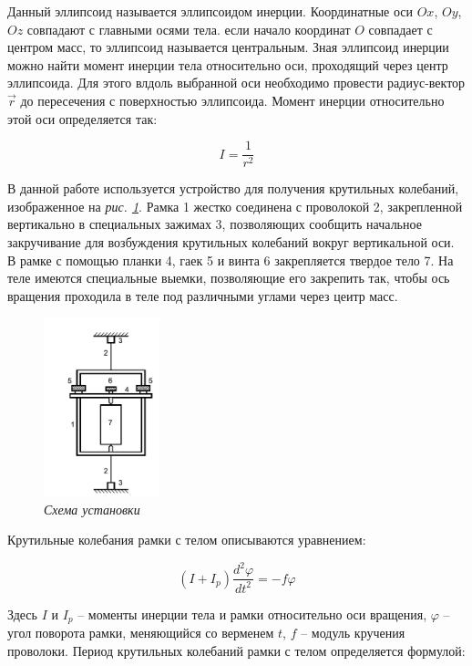 \documentclass[a4paper,12pt]{article}
\begin{document}
Данный эллипсоид называется эллипсоидом инерции. Координатные оси $Ox$, $Oy$, $Oz$ совпадают с главными осями тела. если начало координат $O$ совпадает с центром масс, то эллипсоид называется центральным. Зная эллипсоид инерции можно найти момент инерции тела относительно оси, проходящий через центр эллипсоида. Для этого влдоль выбранной оси необходимо провести радиус-вектор $\vec{r}$ до пересечения с поверхностью эллипсоида. Момент инерции относительно этой оси определяется так:

\begin{equation}
    I = \frac{1}{r^2}
\end{equation}

В данной работе используется устройство для получения крутильных колебаний, изображенное на \textit{рис.  \ref{ustan}}. Рамка 1 жестко соединена с проволокой 2, закрепленной вертикально в специальных зажимах 3, позволяющих сообщить начальное закручивание для возбуждения крутильных колебаний вокруг вертикальной оси. В рамке с помощью планки 4, гаек 5 и винта 6 закрепляется твердое тело 7. На теле имеются специальные выемки, позволяющие его закрепить так, чтобы ось вращения проходила в теле под различными углами через цеитр масс.

\begin{figure}[h!]
        \centering
	\includegraphics[width=0.3\textwidth]{ustan.png}
	\caption{\textit{Схема установки}}
	\label{ustan}
\end{figure}

Крутильные колебания рамки с телом описываются уравнением:

\begin{equation}
    \left( I + I_{p} \right) \frac{d^2 \varphi}{dt^2} = - f \varphi
\end{equation}

Здесь $I$ и $I_{p}$ -- моменты инерции тела и рамки относительно оси вращения, $\varphi$ -- угол поворота рамки, меняющийся со верменем $t$, $f$ -- модуль кручения проволоки. Период крутильных
 колебаний рамки с телом определяется формулой:
 
\end{document}
